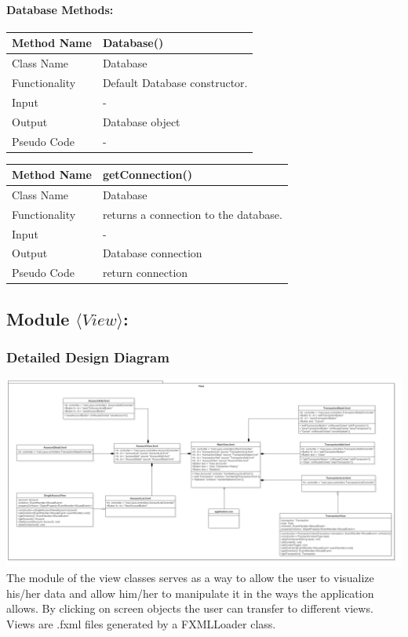 \documentclass[12pt]{article}
\begin{document}
\paragraph {Database Methods:}

\begin{tabular}{ |p{3cm}||p{\colWidth}|  }
	\hline
	Method Name &  Database()\\
	\hline
	Class Name & Database\\
	\hline
	Functionality & Default Database constructor.\\
	\hline
	Input & -\\
	\hline
	Output & Database object\\
	\hline
	Pseudo Code & -\\
	\hline
\end{tabular}    

\begin{tabular}{ |p{3cm}||p{\colWidth}|  }
	\hline
	Method Name &  getConnection()\\
	\hline
	Class Name & Database\\
	\hline
	Functionality & returns a connection to the database.\\
	\hline
	Input & -\\
	\hline
	Output & Database connection\\
	\hline
	Pseudo Code & return connection\\
	\hline
\end{tabular}  

\subsection{Module $\langle View\rangle$:}
\subsubsection{Detailed Design Diagram}

\includegraphics[width=\graphicwidth]{images/view.png}
The module of the view classes serves as a way to allow the user to visualize his/her data and allow him/her to manipulate it in the ways the application allows. By clicking on screen objects the user can transfer to different views. Views are .fxml files generated by a FXMLLoader class.
\end{document}
